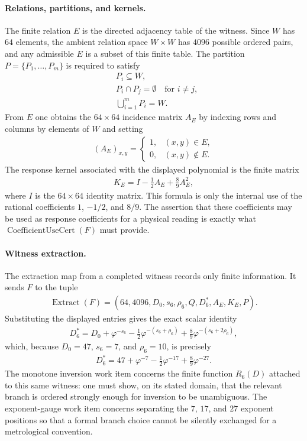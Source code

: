 \paragraph{Relations, partitions, and kernels.}
The finite relation $E$ is the directed adjacency table of the witness.  Since $W$ has $64$ elements, the ambient relation space $W\times W$ has $4096$ possible ordered pairs, and any admissible $E$ is a subset of this finite table.  The partition $P=\{P_1,\ldots,P_m\}$ is required to satisfy
$$
\begin{aligned}
&P_i\subseteq W,\\
&P_i\cap P_j=\emptyset\quad\text{for }i\ne j,\\
&\bigcup_{i=1}^{m}P_i=W.
\end{aligned}
$$
From $E$ one obtains the $64\times64$ incidence matrix $A_E$ by indexing rows and columns by elements of $W$ and setting
$$
\begin{aligned}
(A_E)_{x,y}=\begin{cases}1,&(x,y)\in E,\\0,&(x,y)\notin E.\end{cases}
\end{aligned}
$$
The response kernel associated with the displayed polynomial is the finite matrix
$$
\begin{aligned}
K_E=I-\frac{1}{2}A_E+\frac{8}{9}A_E^2,
\end{aligned}
$$
where $I$ is the $64\times64$ identity matrix.  This formula is only the internal use of the rational coefficients $1$, $-1/2$, and $8/9$.  The assertion that these coefficients may be used as response coefficients for a physical reading is exactly what $\operatorname{CoefficientUseCert}(F)$ must provide.

\paragraph{Witness extraction.}
The extraction map from a completed witness records only finite information.  It sends $F$ to the tuple
$$
\begin{aligned}
\operatorname{Extract}(F)=(64,4096,D_0,s_6,\rho_6,Q,D_6^\ast,A_E,K_E,P).
\end{aligned}
$$
Substituting the displayed entries gives the exact scalar identity
$$
\begin{aligned}
D_6^\ast=D_0+\varphi^{-s_6}-\frac{1}{2}\varphi^{-(s_6+\rho_6)}+\frac{8}{9}\varphi^{-(s_6+2\rho_6)},
\end{aligned}
$$
which, because $D_0=47$, $s_6=7$, and $\rho_6=10$, is precisely
$$
\begin{aligned}
D_6^\ast=47+\varphi^{-7}-\frac{1}{2}\varphi^{-17}+\frac{8}{9}\varphi^{-27}.
\end{aligned}
$$
The monotone inversion work item concerns the finite function $R_6(D)$ attached to this same witness: one must show, on its stated domain, that the relevant branch is ordered strongly enough for inversion to be unambiguous.  The exponent-gauge work item concerns separating the $7$, $17$, and $27$ exponent positions so that a formal branch choice cannot be silently exchanged for a metrological convention.

